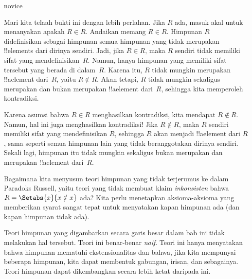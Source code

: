 \documentclass[../../../include/open-logic-section]{subfiles}
\begin{document}
\begin{tagblock}{novice}
\begin{explain}
Mari kita telaah bukti ini dengan lebih perlahan. Jika $R$ ada, masuk
akal untuk menanyakan apakah $R \in R$. Andaikan memang $R \in R$.
Himpunan $R$ didefinisikan sebagai himpunan semua himpunan yang tidak
merupakan !!{element}s dari dirinya sendiri. Jadi, jika $R \in R$,
maka $R$ sendiri tidak memiliki sifat yang mendefinisikan~$R$. Namun,
hanya himpunan yang memiliki sifat tersebut yang berada di dalam~$R$.
Karena itu, $R$ tidak mungkin merupakan !!a{element} dari~$R$, yaitu
$R \notin R$. Akan tetapi, $R$ tidak mungkin sekaligus merupakan dan
bukan merupakan !!a{element} dari~$R$, sehingga kita memperoleh
kontradiksi.

Karena asumsi bahwa $R \in R$ menghasilkan kontradiksi, kita mendapat
$R \notin R$. Namun, hal ini juga menghasilkan kontradiksi!{} Jika
$R \notin R$, maka $R$ sendiri memiliki sifat yang mendefinisikan
$R$, sehingga $R$ akan menjadi !!a{element} dari $R$, sama seperti
semua himpunan lain yang tidak beranggotakan dirinya sendiri. Sekali
lagi, himpunan itu tidak mungkin sekaligus bukan merupakan dan merupakan
!!a{element} dari~$R$.
\end{explain}
\end{tagblock}

\begin{digress}
Bagaimana kita menyusun teori himpunan yang tidak terjerumus ke dalam
Paradoks Russell, yaitu teori yang tidak membuat klaim
\emph{inkonsisten} bahwa $R = \Setabs{x}{x \notin x}$ ada? Kita perlu
menetapkan aksioma-aksioma yang memberikan syarat sangat tepat untuk
menyatakan kapan himpunan ada (dan kapan himpunan tidak ada).
	
Teori himpunan yang digambarkan secara garis besar dalam bab ini tidak
melakukan hal tersebut. Teori ini benar-benar \emph{naif}. Teori ini
hanya menyatakan bahwa himpunan mematuhi ekstensionalitas dan bahwa,
jika kita mempunyai beberapa himpunan, kita dapat membentuk gabungan,
irisan, dan sebagainya. Teori himpunan dapat dikembangkan secara lebih
ketat daripada ini. 
\end{digress}
\end{document}
